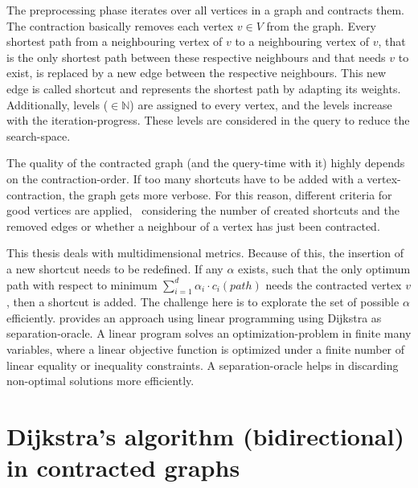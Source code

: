     The preprocessing phase iterates over all vertices in a graph and contracts them.
    The contraction basically removes each vertex $v \in V$ from the graph.
    Every shortest path from a neighbouring vertex of $v$ to a neighbouring vertex of $v$, that is the only shortest path between these respective neighbours and that needs $v$ to exist, is replaced by a new edge between the respective neighbours.
    This new edge is called shortcut and represents the shortest path by adapting its weights.
    Additionally, levels ($\in \mathbb{N}$) are assigned to every vertex, and the levels increase with the iteration-progress.
    These levels are considered in the query to reduce the search-space.

    The quality of the contracted graph (and the query-time with it) highly depends on the contraction-order.
    If too many shortcuts have to be added with a vertex-contraction, the graph gets more verbose.
    For this reason, different criteria for good vertices are applied, \eg\ considering the number of created shortcuts and the removed edges or whether a neighbour of a vertex has just been contracted.

    This thesis deals with multidimensional metrics.
    Because of this, the insertion of a new shortcut needs to be redefined.
    If any $\alpha$ exists, such that the only optimum path with respect to minimum $\sum_{i=1}^{d} \alpha_i \cdot c_i(\mathit{path})$ needs the contracted vertex $v$, then a shortcut is added.
    The challenge here is to explorate the set of possible $\alpha$ efficiently.
    \cite{funke:personal-routes} provides an approach using linear programming using Dijkstra as separation-oracle.
    A linear program solves an optimization-problem in finite many variables, where a linear objective function is optimized under a finite number of linear equality or inequality constraints.
    A separation-oracle helps in discarding non-optimal solutions more efficiently.

\section{Dijkstra's algorithm (bidirectional) in contracted graphs}
\label{chap:preliminaries:ch-dijkstra}

